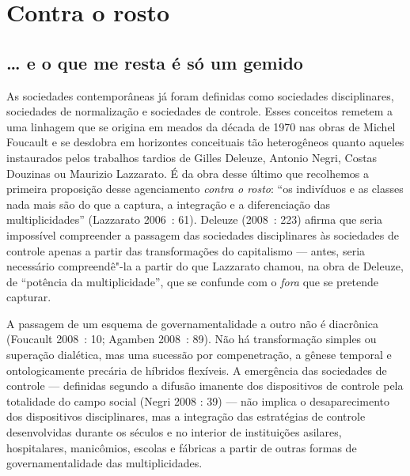 \chapter{Contra o rosto}


\section{\ldots{} e o que me resta é só um gemido}

As sociedades contemporâneas já foram definidas como sociedades
disciplinares, sociedades de normalização e sociedades de controle.
Esses conceitos remetem a uma linhagem que se origina em meados da
década de 1970 nas obras de Michel Foucault e se desdobra em horizontes
conceituais tão heterogêneos quanto aqueles instaurados pelos trabalhos
tardios de Gilles Deleuze, Antonio Negri, Costas Douzinas ou Maurizio
Lazzarato. É da obra desse último que recolhemos a primeira proposição
desse agenciamento \emph{contra o rosto}: ``os indivíduos e as classes
nada mais são do que a captura, a integração e a diferenciação das
multiplicidades'' (Lazzarato 2006~: 61). Deleuze (2008~: 223) afirma que
seria impossível compreender a passagem das sociedades disciplinares às
sociedades de controle apenas a partir das transformações do capitalismo
--- antes, seria necessário compreendê"-la a partir do que Lazzarato
chamou, na obra de Deleuze, de ``potência da multiplicidade'', que se
confunde com o \emph{fora} que se pretende capturar.

A passagem de um esquema de governamentalidade a outro não é diacrônica
(Foucault 2008~: 10; Agamben 2008~: 89). Não há transformação simples ou
superação dialética, mas uma sucessão por compenetração, a gênese
temporal e ontologicamente precária de híbridos flexíveis. A emergência
das sociedades de controle --- definidas segundo a difusão imanente dos
dispositivos de controle pela totalidade do campo social (Negri 2008 :
39) --- não implica o desaparecimento dos dispositivos disciplinares, mas
a integração das estratégias de controle desenvolvidas durante os
séculos  e  no interior de instituições asilares, hospitalares,
manicômios, escolas e fábricas a partir de outras formas de
governamentalidade das multiplicidades.

